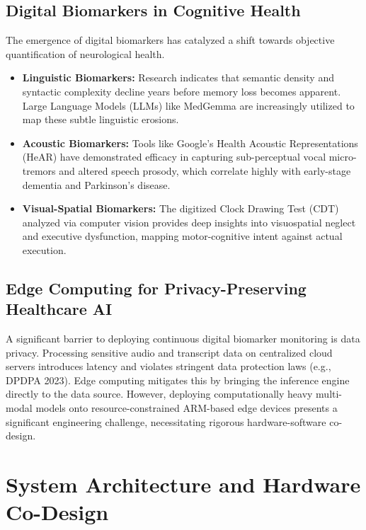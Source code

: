 \documentclass[BTech]{iitmdiss}
\begin{document}
\section{Digital Biomarkers in Cognitive Health}
The emergence of digital biomarkers has catalyzed a shift towards objective quantification of neurological health. 
\begin{itemize}
    \item \textbf{Linguistic Biomarkers:} Research indicates that semantic density and syntactic complexity decline years before memory loss becomes apparent. Large Language Models (LLMs) like MedGemma are increasingly utilized to map these subtle linguistic erosions.
    \item \textbf{Acoustic Biomarkers:} Tools like Google's Health Acoustic Representations (HeAR) have demonstrated efficacy in capturing sub-perceptual vocal micro-tremors and altered speech prosody, which correlate highly with early-stage dementia and Parkinson's disease.
    \item \textbf{Visual-Spatial Biomarkers:} The digitized Clock Drawing Test (CDT) analyzed via computer vision provides deep insights into visuospatial neglect and executive dysfunction, mapping motor-cognitive intent against actual execution.
\end{itemize}

\section{Edge Computing for Privacy-Preserving Healthcare AI}
A significant barrier to deploying continuous digital biomarker monitoring is data privacy. Processing sensitive audio and transcript data on centralized cloud servers introduces latency and violates stringent data protection laws (e.g., DPDPA 2023). Edge computing mitigates this by bringing the inference engine directly to the data source. However, deploying computationally heavy multi-modal models onto resource-constrained ARM-based edge devices presents a significant engineering challenge, necessitating rigorous hardware-software co-design.

\chapter{System Architecture and Hardware Co-Design}
\label{chap:architecture}
\end{document}
